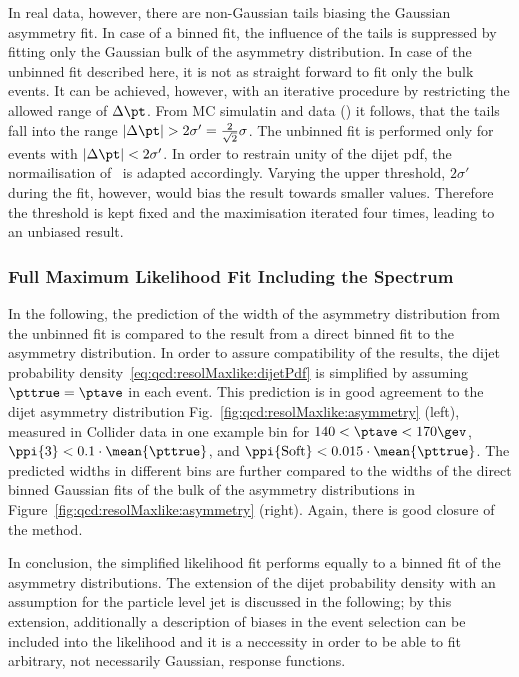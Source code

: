 In real data, however, there are non-Gaussian tails biasing the
Gaussian asymmetry fit.
In case of a binned fit, the influence of the tails is suppressed by
fitting only the Gaussian bulk of the asymmetry distribution.
In case of the unbinned fit described here, it is not as straight
forward to fit only the bulk events.
It can be achieved, however, with an iterative procedure by restricting
the allowed range of $\Delta\pt$.
From MC simulatin and data () it follows,
that the tails fall into the \pt range \mbox{$|\Delta\pt| > 2\sigma' =
  \frac{2}{\sqrt{2}}\sigma$}.
The unbinned fit is performed only for events with \mbox{$|\Delta\pt| < 2\sigma'$}.
In order to restrain unity of the dijet pdf, the normailisation
of~ is adapted accordingly.
Varying the upper threshold, $2\sigma'$ during the fit, however, would
bias the result towards smaller  values.
Therefore the threshold is kept fixed and the maximisation iterated
four times, leading to an unbiased result.





\subsubsection{Full Maximum Likelihood Fit Including the Spectrum}\label{sec:ResFit:Asym:FullFit}


In the following, the prediction of the width of the asymmetry
distribution from the unbinned fit is compared to the result from a direct binned
fit to the asymmetry distribution.
In order to assure compatibility of the results, the dijet probability
density~\eqref{eq:qcd:resolMaxlike:dijetPdf} is simplified by assuming
\mbox{$\pttrue = \ptave$} in each event.
This prediction is in good agreement to the dijet asymmetry distribution
Fig.~\ref{fig:qcd:resolMaxlike:asymmetry} (left), measured in Collider
data in one example bin for \mbox{$140 < \ptave < 170\gev$}, \mbox{$\ppi{3}  < 
  0.1\cdot\mean{\pttrue}$}, and \mbox{$\ppi{\text{Soft}} < 
  0.015\cdot\mean{\pttrue}$}.
The predicted widths in different \ptave bins are further compared to
the widths of the direct binned Gaussian fits of the bulk of the asymmetry
distributions in Figure~\ref{fig:qcd:resolMaxlike:asymmetry} (right).
Again, there is good closure of the method.

In conclusion, the simplified likelihood fit performs equally to a
binned fit of the asymmetry distributions. 
The extension of the dijet probability density with an assumption for the particle
level jet \pt is discussed in the following; by this extension,
additionally a description of biases in the event selection can be
included into the likelihood and it is a neccessity in order to be
able to fit arbitrary, not necessarily Gaussian, response functions.


